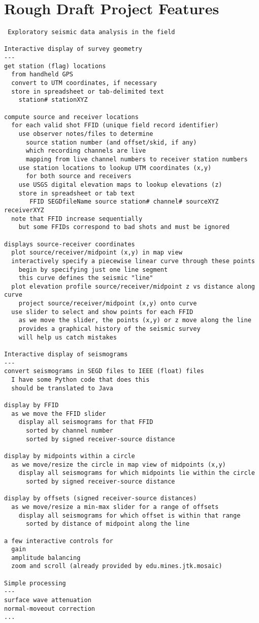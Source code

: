 \documentclass[a4paper,11pt]{texMemo}
\begin{document}
\section*{Rough Draft Project Features}
\begin{verbatim}
 Exploratory seismic data analysis in the field

Interactive display of survey geometry
---
get station (flag) locations
  from handheld GPS
  convert to UTM coordinates, if necessary
  store in spreadsheet or tab-delimited text
    station# stationXYZ

compute source and receiver locations
  for each valid shot FFID (unique field record identifier)
    use observer notes/files to determine 
      source station number (and offset/skid, if any)
      which recording channels are live
      mapping from live channel numbers to receiver station numbers
    use station locations to lookup UTM coordinates (x,y)
      for both source and receivers
    use USGS digital elevation maps to lookup elevations (z) 
    store in spreadsheet or tab text
       FFID SEGDfileName source station# channel# sourceXYZ receiverXYZ
  note that FFID increase sequentially
    but some FFIDs correspond to bad shots and must be ignored

displays source-receiver coordinates
  plot source/receiver/midpoint (x,y) in map view
  interactively specify a piecewise linear curve through these points
    begin by specifying just one line segment
    this curve defines the seismic "line"
  plot elevation profile source/receiver/midpoint z vs distance along curve
    project source/receiver/midpoint (x,y) onto curve
  use slider to select and show points for each FFID
    as we move the slider, the points (x,y) or z move along the line
    provides a graphical history of the seismic survey
    will help us catch mistakes

Interactive display of seismograms
---
convert seismograms in SEGD files to IEEE (float) files
  I have some Python code that does this
  should be translated to Java

display by FFID
  as we move the FFID slider
    display all seismograms for that FFID
      sorted by channel number
      sorted by signed receiver-source distance

display by midpoints within a circle
  as we move/resize the circle in map view of midpoints (x,y)
    display all seismograms for which midpoints lie within the circle
      sorted by signed receiver-source distance

display by offsets (signed receiver-source distances)
  as we move/resize a min-max slider for a range of offsets
    display all seismograms for which offset is within that range
      sorted by distance of midpoint along the line

a few interactive controls for 
  gain
  amplitude balancing
  zoom and scroll (already provided by edu.mines.jtk.mosaic)

Simple processing
---
surface wave attenuation
normal-moveout correction
...
\end{verbatim}
\end{document}
